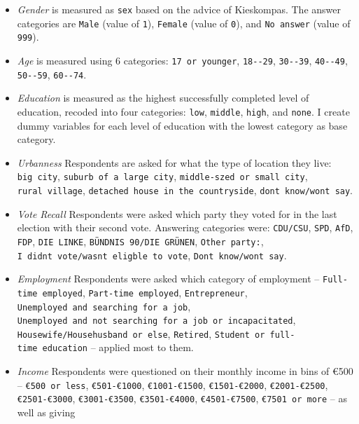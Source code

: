 \documentclass[]{article}
\begin{document}
\begin{itemize}
\item
  \emph{Gender} is measured as \texttt{sex} based on the advice of
  Kieskompas. The answer categories are \texttt{Male} (value of
  \texttt{1}), \texttt{Female} (value of \texttt{0}), and
  \texttt{No\ answer} (value of \texttt{999}).
\item
  \emph{Age} is measured using 6 categories: \texttt{17\ or\ younger},
  \texttt{18-\/-29}, \texttt{30-\/-39}, \texttt{40-\/-49},
  \texttt{50-\/-59}, \texttt{60-\/-74}.
\item
  \emph{Education} is measured as the highest successfully completed
  level of education, recoded into four categories: \texttt{low},
  \texttt{middle}, \texttt{high}, and \texttt{none}. I create dummy
  variables for each level of education with the lowest category as base
  category.
\item
  \emph{Urbanness} Respondents are asked for what the type of location
  they live: \texttt{big\ city}, \texttt{suburb\ of\ a\ large\ city},
  \texttt{middle-szed\ or\ small\ city}, \texttt{rural\ village},
  \texttt{detached\ house\ in\ the\ countryside},
  \texttt{don\textquotesingle{}t\ know/won\textquotesingle{}t\ say}.
\item
  \emph{Vote Recall} Respondents were asked which party they voted for
  in the last election with their second vote. Answering categories
  were: \texttt{CDU/CSU}, \texttt{SPD}, \texttt{AfD}, \texttt{FDP},
  \texttt{DIE\ LINKE}, \texttt{BÜNDNIS\ 90/DIE\ GRÜNEN},
  \texttt{Other\ party:},
  \texttt{I\ didn\textquotesingle{}t\ vote/wasn\textquotesingle{}t\ eligble\ to\ vote},
  \texttt{Don\textquotesingle{}t\ know/won\textquotesingle{}t\ say}.
\item
  \emph{Employment} Respondents were asked which category of employment
  -- \texttt{Full-time\ employed}, \texttt{Part-time\ employed},
  \texttt{Entrepreneur},
  \texttt{Unemployed\ and\ searching\ for\ a\ job},
  \texttt{Unemployed\ and\ not\ searching\ for\ a\ job\ or\ incapacitated},
  \texttt{Housewife/Househusband\ or\ else}, \texttt{Retired},
  \texttt{Student\ or\ full-time\ education} -- applied most to them.
\item
  \emph{Income} Respondents were questioned on their monthly income in
  bins of €500 -- \texttt{€500\ or\ less}, \texttt{€501-€1000},
  \texttt{€1001-€1500}, \texttt{€1501-€2000}, \texttt{€2001-€2500},
  \texttt{€2501-€3000}, \texttt{€3001-€3500}, \texttt{€3501-€4000},
  \texttt{€4501-€7500}, \texttt{€7501\ or\ more} -- as well as giving

\end{itemize}
\end{document}
